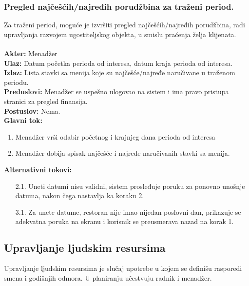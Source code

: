 \documentclass{article}
\begin{document}
\subsubsection{Pregled najčešćih/najređih porudžbina za traženi period.}
Za traženi period, moguće je izvršiti pregled najčešćih/najređih porudžbina, radi upravljanja razvojem ugostiteljskog objekta, u smislu praćenja želja klijenata.\\\\
\textbf{Akter:} Menadžer\\
\textbf{Ulaz:} Datum početka perioda od interesa, datum kraja perioda od interesa.\\
\textbf{Izlaz:} Lista stavki sa menija koje su najčešće/najređe naručivane u traženom periodu.\\
\textbf{Preduslovi:} Menadžer se uspešno ulogovao na sistem i ima pravo pristupa stranici za pregled finansija.\\
\textbf{Postuslov:} Nema.\\
\textbf{Glavni tok:}
\begin{enumerate}
\item Menadžer vrši odabir početnog i krajnjeg dana perioda od interesa
\item Menadžer dobija spisak najčešće i najređe naručivanih stavki sa menija.
\end{enumerate}
\textbf{Alternativni tokovi:}\\
\begin{itemize}
\item [2.1.] Uneti datumi nisu validni, sistem prosleđuje poruku za ponovno unošnje datuma, nakon čega nastavlja ka koraku 2.
\item [3.1.] Za unete datume, restoran nije imao nijedan poslovni dan, prikazuje se adekvatna poruka na ekranu i korisnik se preusmerava nazad na korak 1.
\end{itemize}


\subsection{Upravljanje ljudskim resursima}
Upravljanje ljudskim resursima je slučaj upotrebe u kojem se definišu rasporedi smena i godišnjih odmora. U planiranju učestvuju radnik i menadžer.
\end{document}
